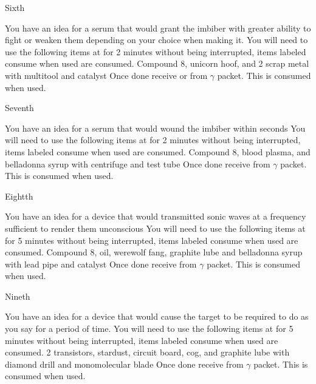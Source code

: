 \documentclass[greennotebook]{guildcamp3} %
\begin{document}
\begin{page}{Sixth}
	
	You have an idea for a serum that would grant the imbiber with greater ability to fight or weaken them depending on your choice when making it.
	You will need to use the following items at \sSciWorkbench{} for 2 minutes without being interrupted, items labeled consume when used are consumed.
	Compound 8, unicorn hoof, and 2 scrap metal with multitool and catalyst
	Once done receive \iCRUpSerum{} or \iCRDownSerum{} from $\gamma$ packet. This is consumed when used. 
	
\end{page}

\begin{page}{Seventh}
	
	You have an idea for a serum that would wound the imbiber within seconds
	You will need to use the following items at \sSciWorkbench{} for 2 minutes without being interrupted, items labeled consume when used are consumed.
	Compound 8, blood plasma, and belladonna syrup with centrifuge and test tube
	Once done receive \iTechPoison{} from $\gamma$ packet. This is consumed when used. 
	
\end{page}

\begin{page}{Eightth}
	
	You have an idea for a device that would transmitted sonic waves at a frequency sufficient to render them unconscious
	You will need to use the following items at \sSciWorkbench{} for 5 minutes without being interrupted, items labeled consume when used are consumed.
	Compound 8, oil, werewolf fang, graphite lube and belladonna syrup with lead pipe and catalyst
	Once done receive \iSonicKO{} from $\gamma$ packet. This is consumed when used. 
	
\end{page}

\begin{page}{Nineth}
	
	You have an idea for a device that would cause the target to be required to do as you say for a period of time.
	You will need to use the following items at \sSciWorkbench{} for 5 minutes without being interrupted, items labeled consume when used are consumed.
	2 transistors, stardust, circuit board, cog, and graphite lube with diamond drill and monomolecular blade
	Once done receive \iMCDevice{} from $\gamma$ packet. This is consumed when used. 
	
\end{page}
\end{document}
